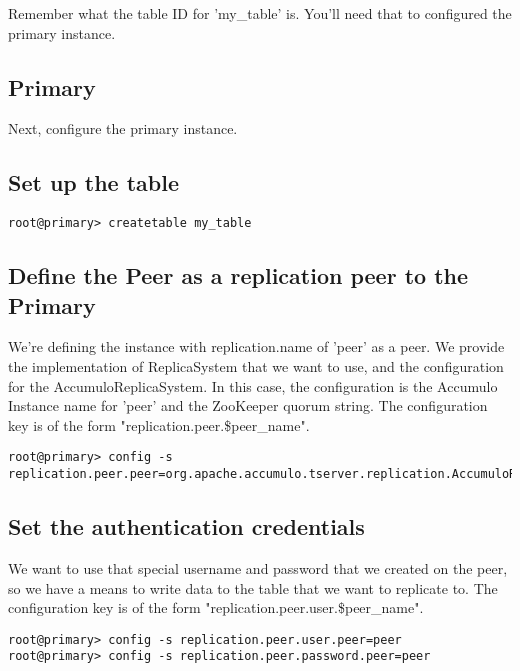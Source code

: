 Remember what the table ID for 'my\_table' is. You'll need that to configured the primary instance.

\subsection{Primary}

Next, configure the primary instance.

\subsection{Set up the table}

\begingroup\fontsize{8pt}{8pt}\selectfont\begin{verbatim}
root@primary> createtable my_table
\end{verbatim}\endgroup

\subsection{Define the Peer as a replication peer to the Primary}

We're defining the instance with replication.name of 'peer' as a peer. We provide the implementation of ReplicaSystem
that we want to use, and the configuration for the AccumuloReplicaSystem. In this case, the configuration is the Accumulo
Instance name for 'peer' and the ZooKeeper quorum string. The configuration key is of the form
"replication.peer.\$peer\_name".

\begingroup\fontsize{8pt}{8pt}\selectfont\begin{verbatim}
root@primary> config -s replication.peer.peer=org.apache.accumulo.tserver.replication.AccumuloReplicaSystem,peer,$peer_zk_quorum
\end{verbatim}\endgroup

\subsection{Set the authentication credentials}

We want to use that special username and password that we created on the peer, so we have a means to write data to
the table that we want to replicate to. The configuration key is of the form "replication.peer.user.\$peer\_name".

\begingroup\fontsize{8pt}{8pt}\selectfont\begin{verbatim}
root@primary> config -s replication.peer.user.peer=peer
root@primary> config -s replication.peer.password.peer=peer
\end{verbatim}\endgroup

